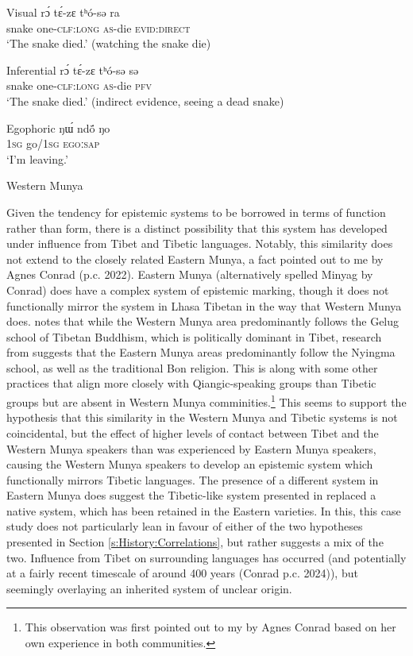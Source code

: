 \begin{exe}
    \ex\label{e:History:WesternMunya}
    \begin{xlist}
\ex Visual
\gll rɔ́ tɛ́-zɛ tʰó-sə ra \\
snake one-\textsc{clf:long} \textsc{as}-die \textsc{evid:direct} \\
\glt ‘The snake died.’ (watching the snake die)

\ex Inferential
\gll rɔ́ tɛ́-zɛ tʰó-sə sə \\
snake one-\textsc{clf:long} \textsc{as}-die \textsc{pfv} \\
\glt ‘The snake died.’ (indirect evidence, seeing a dead snake)

\ex Egophoric
\gll ŋɯ́ ndö́ ŋo \\
\textsc{1sg} go/\textsc{1sg} \textsc{egoːsap} \\
\glt ‘I’m leaving.’
    \end{xlist}
Western Munya \cite[Qiangic: PRC,][241, 247]{Bai2019}
\end{exe}

Given the tendency for epistemic systems to be borrowed in terms of function rather than form, there is a distinct possibility that this system has developed under influence from Tibet and Tibetic languages. Notably, this similarity does not extend to the closely related Eastern Munya, a fact pointed out to me by Agnes Conrad (p.c. 2022). Eastern Munya (alternatively spelled Minyag by Conrad) does have a complex system of epistemic marking, though it does not functionally mirror the system in Lhasa Tibetan in the way that Western Munya does. \cite{Bai2019} notes that while the Western Munya area predominantly follows the Gelug school of Tibetan Buddhism, which is politically dominant in Tibet, research from \cite{Li2006} suggests that the Eastern Munya areas predominantly follow the Nyingma school, as well as the traditional Bon religion. This is along with some other practices that align more closely with Qiangic-speaking groups than Tibetic groups but are absent in Western Munya comminities.\footnote{This observation was first pointed out to my by Agnes Conrad based on her own experience in both communities.} This seems to support the hypothesis that this similarity in the Western Munya and Tibetic systems is not coincidental, but the effect of higher levels of contact between Tibet and the Western Munya speakers than was experienced by Eastern Munya speakers, causing the Western Munya speakers to develop an epistemic system which functionally mirrors Tibetic languages. The presence of a different system in Eastern Munya does suggest the Tibetic-like system presented in  replaced a native system, which has been retained in the Eastern varieties. In this, this case study does not particularly lean in favour of either of the two hypotheses presented in Section \ref{s:History:Correlations}, but rather suggests a mix of the two. Influence from Tibet on surrounding languages has occurred (and potentially at a fairly recent timescale of around 400 years (Conrad p.c. 2024)), but seemingly overlaying an inherited system of unclear origin.

